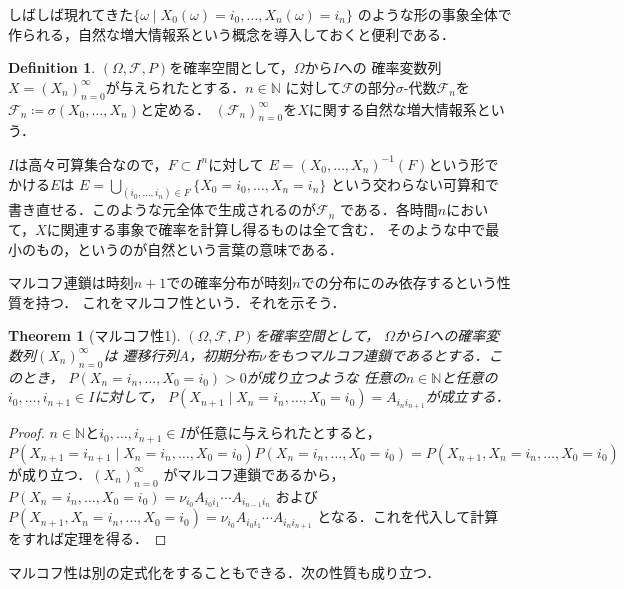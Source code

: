 \documentclass[dvipdfmx,autodetect-engine]{jsarticle}
\newtheorem{theorem}{Theorem}[section]
\theoremstyle{remark}
\theoremstyle{definition}
\newtheorem{definition}{Definition}[section]
\newcommand{\N}{\mathbb{N}}
\begin{document}
しばしば現れてきた$\{ \omega \mid X_0 (\omega)= i_0,\ldots, X_n (\omega)= i_n\}$
のような形の事象全体で作られる，自然な増大情報系という概念を導入しておくと便利である．


\begin{definition}
    $(\Omega,\mathcal{F},P)$を確率空間として，$\Omega$から$I$への
    確率変数列$X = (X_n)_{n=0}^{\infty}$が与えられたとする．$n \in \N$
    に対して$\mathcal{F}$の部分$\sigma$-代数$\mathcal{F}_n$を
    $\mathcal{F}_n \coloneqq \sigma (X_0,\ldots,X_n)$と定める．
    $(\mathcal{F}_n)_{n =0}^{\infty}$を$X$に関する自然な増大情報系という．
\end{definition}


$I$は高々可算集合なので，$F\subset I^n$に対して
$E = (X_0,\ldots,X_n)^{-1} (F)$という形でかける$E$は
$E = \bigcup_{(i_0,\ldots,i_n) \in F} \{X_0 = i_0,\ldots,X_n = i_n\}$
という交わらない可算和で書き直せる．このような元全体で生成されるのが$\mathcal{F}_n$
である．各時間$n$において，$X$に関連する事象で確率を計算し得るものは全て含む．
そのような中で最小のもの，というのが自然という言葉の意味である．

マルコフ連鎖は時刻$n+1$での確率分布が時刻$n$での分布にのみ依存するという性質を持つ．
これをマルコフ性という．それを示そう．


\begin{theorem}[マルコフ性1]
    $(\Omega,\mathcal{F},P)$を確率空間として，
    $\Omega$から$I$への確率変数列$(X_n)_{n=0}^{\infty}$は
    遷移行列$A$，初期分布$\nu$をもつマルコフ連鎖であるとする．このとき，
    $P(X_n = i_n,\ldots,X_0 = i_0) >0$が成り立つような
    任意の$n \in \N$と任意の$i_0,\ldots,i_{n+1} \in I$に対して，
    $P(X_{n+1} \mid X_n = i_n,\ldots,X_0 = i_0)=A_{i_n i_{n+1}}$が成立する．
\end{theorem}


\begin{proof}
    $n \in \N$と$i_0,\ldots,i_{n+1} \in I$が任意に与えられたとすると，
    $P(X_{n+1}=i_{n+1} \mid X_n = i_n,\ldots,X_0 = i_0)P(X_n = i_n,\ldots,X_0 = i_0) 
    = P(X_{n+1},X_n = i_n,\ldots,X_0 = i_0)$が成り立つ．$(X_n)_{n=0}^{\infty}$
    がマルコフ連鎖であるから，$P(X_n = i_n,\ldots,X_0 = i_0) = \nu_{i_0} A_{i_0 i_1} \cdots A_{i_{n-1} i_n}$
    および$P(X_{n+1},X_n = i_n,\ldots,X_0 = i_0) = \nu_{i_0} A_{i_0 i_1} \cdots A_{i_{n} i_{n+1}}$
    となる．これを代入して計算をすれば定理を得る．
\end{proof}


マルコフ性は別の定式化をすることもできる．次の性質も成り立つ．
\end{document}

